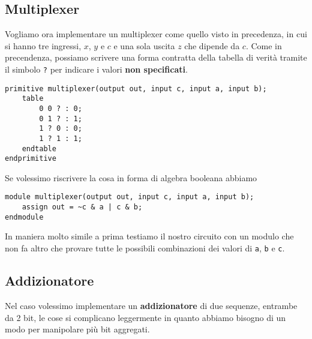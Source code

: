 \subsection{Multiplexer}
Vogliamo ora implementare un multiplexer come quello visto in precedenza, in cui si hanno tre
ingressi, $x$, $y$ e $c$ e una sola uscita $z$ che dipende da $c$. Come in precendenza, possiamo
scrivere una forma contratta della tabella di verità tramite il simbolo \verb|?| per indicare i
valori \textbf{non specificati}.
\begin{verbatim}
primitive multiplexer(output out, input c, input a, input b);
	table
		0 0 ? : 0;
		0 1 ? : 1;
		1 ? 0 : 0;
		1 ? 1 : 1;
	endtable
endprimitive
\end{verbatim}
Se volessimo riscrivere la cosa in forma di algebra booleana abbiamo
\begin{verbatim}
module multiplexer(output out, input c, input a, input b);
	assign out = ~c & a | c & b;
endmodule
\end{verbatim}
In maniera molto simile a prima testiamo il nostro circuito con un modulo che non fa altro che
provare tutte le possibili combinazioni dei valori di \verb|a|, \verb|b| e \verb|c|.

\subsection{Addizionatore}
Nel caso volessimo implementare un \textbf{addizionatore} di due sequenze, entrambe da 2 bit, le
cose si complicano leggermente in quanto abbiamo bisogno di un modo per manipolare più bit
aggregati.